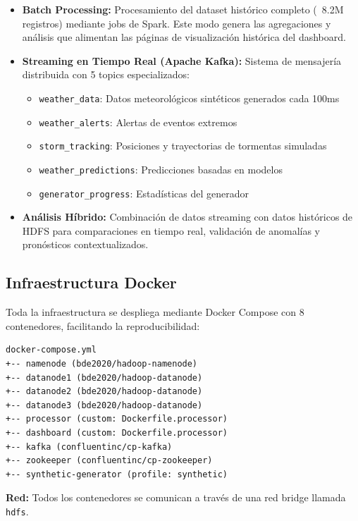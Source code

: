 \documentclass[12pt,a4paper]{scrartcl}
\begin{document}
\begin{itemize}
    \item \textbf{Batch Processing:} Procesamiento del dataset histórico completo (~8.2M registros) mediante jobs de Spark. Este modo genera las agregaciones y análisis que alimentan las páginas de visualización histórica del dashboard.
    
    \item \textbf{Streaming en Tiempo Real (Apache Kafka):} Sistema de mensajería distribuida con 5 topics especializados:
    \begin{itemize}
        \item \texttt{weather\_data}: Datos meteorológicos sintéticos generados cada 100ms
        \item \texttt{weather\_alerts}: Alertas de eventos extremos
        \item \texttt{storm\_tracking}: Posiciones y trayectorias de tormentas simuladas
        \item \texttt{weather\_predictions}: Predicciones basadas en modelos
        \item \texttt{generator\_progress}: Estadísticas del generador
    \end{itemize}
    
    \item \textbf{Análisis Híbrido:} Combinación de datos streaming con datos históricos de HDFS para comparaciones en tiempo real, validación de anomalías y pronósticos contextualizados.
\end{itemize}

\subsection{Infraestructura Docker}

Toda la infraestructura se despliega mediante Docker Compose con 8 contenedores, facilitando la reproducibilidad:

\begin{verbatim}
docker-compose.yml
+-- namenode (bde2020/hadoop-namenode)
+-- datanode1 (bde2020/hadoop-datanode)
+-- datanode2 (bde2020/hadoop-datanode)
+-- datanode3 (bde2020/hadoop-datanode)
+-- processor (custom: Dockerfile.processor)
+-- dashboard (custom: Dockerfile.processor)
+-- kafka (confluentinc/cp-kafka)
+-- zookeeper (confluentinc/cp-zookeeper)
+-- synthetic-generator (profile: synthetic)
\end{verbatim}

\textbf{Red:} Todos los contenedores se comunican a través de una red bridge llamada \texttt{hdfs}.
\end{document}
